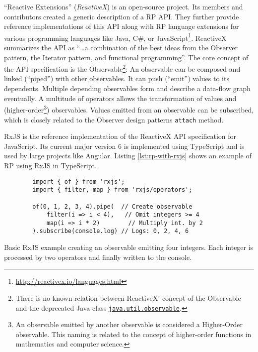 \documentclass[sigplan,screen,review]{acmart}
\begin{document}
``Reactive Extensions'' (\emph{ReactiveX}) is an open-source project. Its members and contributors created a generic description of a RP API. They further provide reference implementations of this API along with RP language extensions for various programming languages like Java, C\#, or JavaScript\footnote{\url{http://reactivex.io/languages.html}}. ReactiveX summarizes the API as ``\dots a combination of the best ideas from the Observer pattern, the Iterator pattern, and functional programming''\cite{reactivex}. The core concept of the API specification is the Observable\footnote{There is no known relation between ReactiveX' concept of the Observable and the deprecated Java class \href{https://docs.oracle.com/en/java/javase/11/docs/api/java.base/java/util/Observable.html}{\texttt{java.util.observable}}.}: An observable can be composed and linked (``piped'') with other observables. It can push (``emit'') values to its dependents. Multiple depending observables form and describe a data-flow graph eventually. A multitude of operators allows the transformation of values and (higher-order\footnote{An observable emitted by another observable is considered a Higher-Order observable. This naming is related to the concept of higher-order functions in mathematics and computer science.}) observables. Values emitted from an observable can be subscribed, which is closely related to the Observer design patterns \texttt{attach} method.

RxJS\cite{rxjs} is the reference implementation of the ReactiveX API specification for JavaScript. Its current major version 6 is implemented using TypeScript and is used by large projects like Angular\cite{angualrrxjs}. Listing \ref{lst:rp-with-rxjs} shows an example of RP using RxJS in TypeScript.

\begin{listing}
	\begin{verbatim}
		import { of } from 'rxjs';
		import { filter, map } from 'rxjs/operators';

		of(0, 1, 2, 3, 4).pipe(  // Create observable
			filter(i => i < 4),	  // Omit integers >= 4
			map(i => i * 2)        // Multiply int. by 2
		).subscribe(console.log) // Logs: 0, 2, 4, 6
	\end{verbatim}
	\caption{Basic RxJS example creating an observable emitting four integers. Each integer is processed by two operators and finally written to the console.}
	\label{lst:rp-with-rxjs}
\end{listing}
\end{document}
